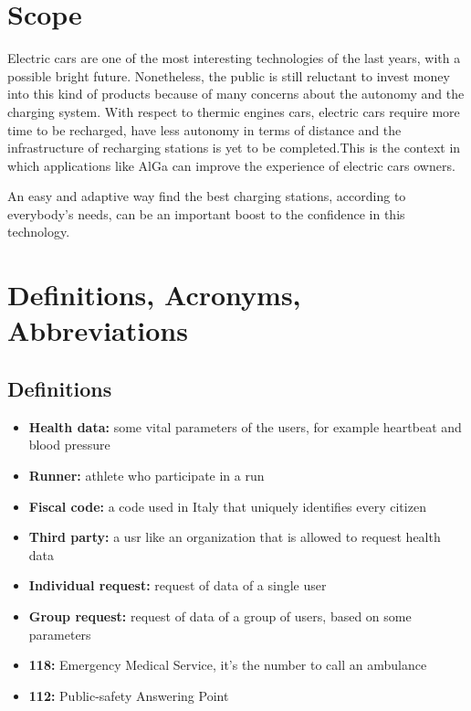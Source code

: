 \section{Scope}
Electric cars are one of the most interesting technologies of the last years, with a possible bright future. Nonetheless, the public is still reluctant to invest money into this kind of products because of many concerns about the autonomy and the charging system.
With respect to thermic engines cars, electric cars require more time to be recharged, have less autonomy in terms of distance and the infrastructure of recharging stations is yet to be completed.This is the context in which applications like AlGa can improve the experience of electric cars owners.

An easy and adaptive way find the best charging stations, according to everybody's needs, can be an important boost to the confidence in this technology. 

\section{Definitions, Acronyms, Abbreviations}
\subsection*{Definitions}
\begin{itemize}
    \item \textbf{Health data:} some vital parameters of the users, for example heartbeat and blood pressure
    \item \textbf{Runner:} athlete who participate in a run
    \item \textbf{Fiscal code:} a code used in Italy that uniquely identifies every citizen
    \item \textbf{Third party:} a usr like an organization that is allowed to request health data
    \item \textbf{Individual request:} request of data of a single user 
    \item \textbf{Group request:} request of data of a group of users, based on some parameters 
    \item \textbf{118:} Emergency Medical Service, it's the number to call an ambulance
    \item \textbf{112:} Public-safety Answering Point
\end{itemize}
